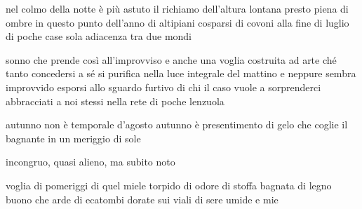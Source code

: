 \clearpage


\begin{poem}
	\begin{stanza}
		nel colmo della notte è più astuto il richiamo\verseline
		dell'altura lontana\verseline
		presto piena di ombre in questo punto dell'anno\verseline
		di altipiani cosparsi di covoni alla fine di luglio\verseline
		di poche case\verseline
		sola adiacenza tra due mondi
	\end{stanza}
\end{poem}

\clearpage


\begin{poem}
	\begin{stanza}
		sonno che prende così all'improvviso\verseline
		e anche una voglia costruita ad arte\verseline
		ché tanto concedersi a sé si purifica\verseline
		nella luce integrale del mattino\verseline
		e neppure sembra improvvido esporsi\verseline
		allo sguardo furtivo di chi\verseline
		il caso vuole a sorprenderci\verseline
		abbracciati a noi stessi\verseline
		nella rete di poche lenzuola
	\end{stanza}
\end{poem}

\clearpage


\begin{poem}
	\begin{stanza}
		autunno non è temporale d'agosto\verseline
		autunno è presentimento di gelo\verseline
		che coglie il bagnante in un meriggio di sole
	\end{stanza}

	\begin{stanza}
		incongruo, quasi alieno, ma subito noto
	\end{stanza}
\end{poem}

\clearpage


\begin{poem}
	\begin{stanza}
		voglia di pomeriggi\verseline
		di quel miele torpido\verseline
		di odore di stoffa bagnata\verseline
		di legno buono che arde\verseline
		di ecatombi dorate sui viali\verseline
		di sere umide e mie
	\end{stanza}
\end{poem}
